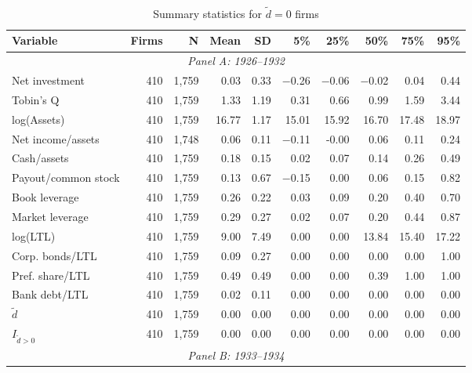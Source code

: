 \begin{table}[p]\centering
    \caption{\\ Summary statistics for $\tilde{d} = 0$ firms}\scriptsize
    \label{tabapp:summary_I_0}
    \begin{threeparttable}
        \begin{tabular}{lrrrrrrrrr}
            \toprule
            Variable & Firms & N & Mean & SD & 5\% & 25\% & 50\% & 75\% & 95\% \\
            \midrule
            \multicolumn{10}{c}{\textit{Panel A: 1926--1932}} \\
            \midrule
            Net investment & 410 & 1,759 & 0.03 & 0.33 & $-$0.26 & $-$0.06 & $-$0.02 & 0.04 & 0.44 \\
            Tobin's Q & 410 & 1,759 & 1.33 & 1.19 & 0.31 & 0.66 & 0.99 & 1.59 & 3.44 \\
            log(Assets) & 410 & 1,759 & 16.77 & 1.17 & 15.01 & 15.92 & 16.70 & 17.48 & 18.97 \\
            Net income/assets & 410 & 1,748 & 0.06 & 0.11 & $-$0.11 & -0.00 & 0.06 & 0.11 & 0.24 \\
            Cash/assets & 410 & 1,759 & 0.18 & 0.15 & 0.02 & 0.07 & 0.14 & 0.26 & 0.49 \\
            Payout/common stock & 410 & 1,759 & 0.13 & 0.67 & $-$0.15 & 0.00 & 0.06 & 0.15 & 0.82 \\
            Book leverage & 410 & 1,759 & 0.26 & 0.22 & 0.03 & 0.09 & 0.20 & 0.40 & 0.70 \\
            Market leverage & 410 & 1,759 & 0.29 & 0.27 & 0.02 & 0.07 & 0.20 & 0.44 & 0.87 \\
            log(LTL) & 410 & 1,759 & 9.00 & 7.49 & 0.00 & 0.00 & 13.84 & 15.40 & 17.22 \\
            Corp. bonds/LTL & 410 & 1,759 & 0.09 & 0.27 & 0.00 & 0.00 & 0.00 & 0.00 & 1.00 \\
            Pref. share/LTL & 410 & 1,759 & 0.49 & 0.49 & 0.00 & 0.00 & 0.39 & 1.00 & 1.00 \\
            Bank debt/LTL & 410 & 1,759 & 0.02 & 0.11 & 0.00 & 0.00 & 0.00 & 0.00 & 0.00 \\
            \ensuremath{\tilde{d}} & 410 & 1,759 & 0.00 & 0.00 & 0.00 & 0.00 & 0.00 & 0.00 & 0.00 \\
            \ensuremath{I_{\tilde{d}>0}} & 410 & 1,759 & 0.00 & 0.00 & 0.00 & 0.00 & 0.00 & 0.00 & 0.00 \\
            \midrule
            \multicolumn{10}{c}{\textit{Panel B: 1933--1934}} \\

\end{tabular}
\end{threeparttable}
\end{table}
